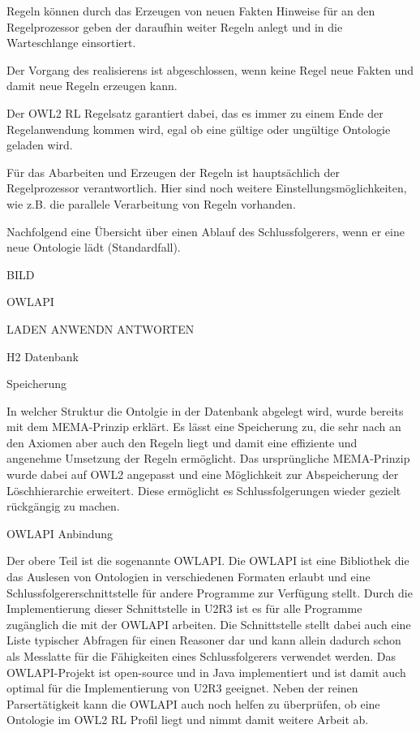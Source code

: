 Regeln können durch das Erzeugen von neuen Fakten Hinweise für an den Regelprozessor geben der daraufhin weiter Regeln anlegt und in die Warteschlange einsortiert.

Der Vorgang des realisierens ist abgeschlossen, wenn keine Regel neue Fakten und damit neue Regeln erzeugen kann.

Der OWL2 RL Regelsatz garantiert dabei, das es immer zu einem Ende der Regelanwendung kommen wird, egal ob eine gültige oder ungültige Ontologie geladen wird.

Für das Abarbeiten und Erzeugen der Regeln ist hauptsächlich der Regelprozessor verantwortlich. Hier sind noch weitere Einstellungsmöglichkeiten, wie z.B. die parallele Verarbeitung von Regeln vorhanden.

Nachfolgend eine Übersicht über einen Ablauf des Schlussfolgerers, wenn er eine neue Ontologie lädt (Standardfall).

BILD 

OWLAPI

LADEN ANWENDN ANTWORTEN

H2 Datenbank



Speicherung

In welcher Struktur die Ontolgie in der Datenbank abgelegt wird, wurde bereits mit dem MEMA-Prinzip erklärt. Es lässt eine Speicherung zu, die sehr nach an den Axiomen aber auch den Regeln liegt und damit eine effiziente und angenehme Umsetzung der Regeln ermöglicht. Das ursprüngliche MEMA-Prinzip wurde dabei auf OWL2 angepasst und eine Möglichkeit zur Abspeicherung der Löschhierarchie erweitert. Diese ermöglicht es Schlussfolgerungen wieder gezielt rückgängig zu machen.

OWLAPI Anbindung

Der obere Teil ist die sogenannte OWLAPI. Die OWLAPI ist eine Bibliothek die das Auslesen von Ontologien in verschiedenen Formaten erlaubt und eine Schlussfolgererschnittstelle für andere Programme zur Verfügung stellt. Durch die Implementierung dieser Schnittstelle in U2R3 ist es für alle Programme zugänglich die mit der OWLAPI arbeiten.
Die Schnittstelle stellt dabei auch eine Liste typischer Abfragen für einen Reasoner dar und kann allein dadurch schon als Messlatte für die Fähigkeiten eines Schlussfolgerers verwendet werden. Das OWLAPI-Projekt ist open-source und in Java implementiert und ist damit auch optimal für die Implementierung von U2R3 geeignet. Neben der reinen Parsertätigkeit kann die OWLAPI auch noch helfen zu überprüfen, ob eine Ontologie im OWL2 RL Profil liegt und nimmt damit weitere Arbeit ab.

